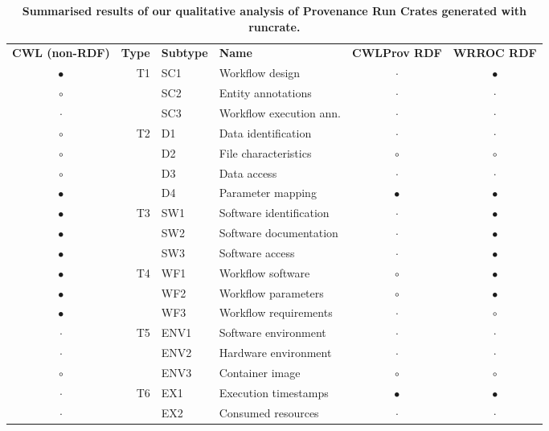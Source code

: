 \documentclass[10pt,letterpaper]{article}
\newlength\savedwidth
\newcommand\thickhline{\noalign{\global\savedwidth\arrayrulewidth\global\arrayrulewidth 2pt}%
\hline
\noalign{\global\arrayrulewidth\savedwidth}}
\begin{document}
\begin{table}[ht]
\begin{adjustwidth}{-5cm}{0in} %
\centering
\caption{
{\bf Summarised results of our qualitative analysis of Provenance Run Crates generated with runcrate.}}
\begin{tabular}{c|r|l|l|c|c}
\hline
{\bf CWL (non-RDF)} & {\bf Type} & {\bf Subtype}      & {\bf Name} & {\bf CWLProv RDF} & {\bf WRROC RDF}  
\\ \thickhline
$\bullet$ & T1 & SC1 & Workflow design  &   $\cdot$ & $\bullet$  \\ 
$\circ$ & & SC2 & Entity annotations      &  $\cdot$ &  $\cdot$   \\ 
$\cdot$  & & SC3 & Workflow execution ann. &  $\cdot$ &  $\cdot$  \\ \hline
$\circ$ & T2 & D1 & Data identification   & $\cdot$ &  $\cdot$ \\
$\circ$ & & D2 & File characteristics     & $\circ$ & $\circ$ \\
$\circ$ & & D3 & Data access              &  $\cdot$ &  $\cdot$  \\ 
$\bullet$ & & D4 & Parameter mapping        & $\bullet$ & $\bullet$ \\ \hline 
$\bullet$ & T3 & SW1 & Software identification &  $\cdot$ & $\bullet$  \\ 
$\bullet$ & & SW2 & Software documentation  &  $\cdot$ & $\bullet$  \\  
$\bullet$ & & SW3 & Software access         &  $\cdot$ & $\bullet$ \\ \hline 
$\bullet$ & T4 & WF1 & Workflow software    & $\circ$ & $\bullet$  \\ 
$\bullet$ & & WF2 & Workflow parameters     & $\circ$ & $\bullet$  \\ 
$\bullet$ & & WF3 & Workflow requirements   &  $\cdot$  &  $\circ$  \\ \hline 
$\cdot$ & T5 & ENV1 & Software environment & $\cdot$ &  $\cdot$  \\ 
$\cdot$ & & ENV2 & Hardware environment   & $\cdot$ &  $\cdot$  \\ 
$\circ$ & & ENV3 & Container image        & $\circ$ &  $\circ$  \\ \hline 
$\cdot$ & T6 & EX1 & Execution timestamps & $\bullet$ & $\bullet$ \\ 
$\cdot$ & & EX2 & Consumed resources      &  $\cdot$ & $\cdot$  \\ 

\end{tabular}
\end{adjustwidth}
\end{table}
\end{document}
